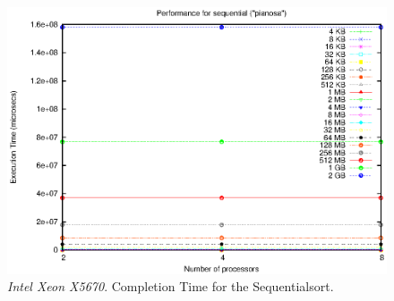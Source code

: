 \begin{figure}[h]
	\begin{center}
		\includegraphics[scale=0.6]{plots/test_00_pcm/NxTxM/sequential_pianosa_NxTxM}
	\end{center}
  	\caption{\textit{Intel Xeon X5670}. Completion Time for the Sequentialsort.}
  	\label{sequential-pianosa}
\end{figure}

